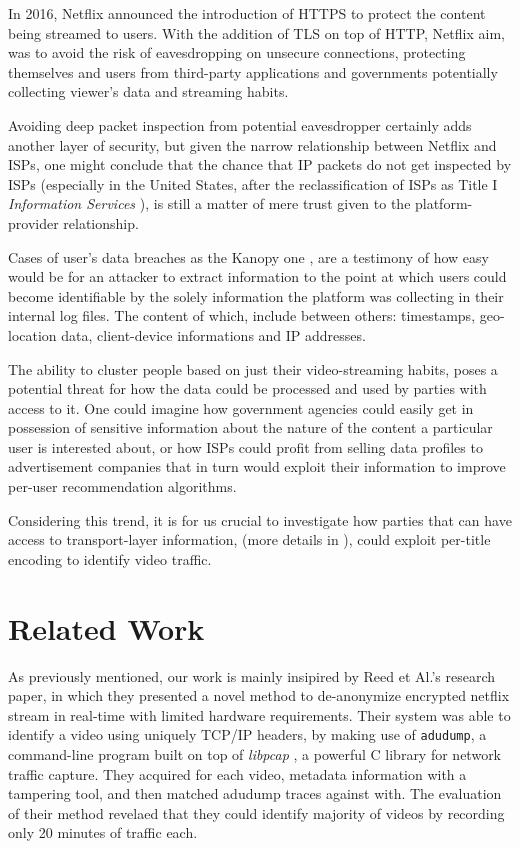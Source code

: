 In 2016, Netflix announced the introduction of HTTPS to protect the content
being streamed to users. With the addition of TLS on top of HTTP, Netflix aim,
was to avoid the risk of eavesdropping on unsecure connections, protecting
themselves and users from third-party applications and governments potentially
collecting viewer's data and streaming habits.

Avoiding deep packet inspection from potential eavesdropper certainly adds
another layer of security, but given the narrow relationship between Netflix
and ISPs, one might conclude that the chance that IP packets do not get
inspected by ISPs (especially in the United States, after the reclassification
of ISPs as Title I \emph{Information Services} \cite{net-neutrality}), is still
a matter of mere trust given to the platform-provider relationship.

Cases of user's data breaches as the Kanopy one \cite{kanopy}, are a testimony
of how easy would be for an attacker to extract information to the point at
which users could become identifiable by the solely information the platform
was collecting in their internal log files. The content of which, include
between others: timestamps, geo-location data, client-device informations and
IP addresses. 

The ability to cluster people based on just their video-streaming habits, poses
a potential threat for how the data could be processed and used by parties with
access to it. One could imagine how government agencies could easily get in
possession of sensitive information about the nature of the content a
particular user is interested about, or how ISPs could profit from selling data
profiles to advertisement companies that in turn would exploit their
information to improve per-user recommendation algorithms.

Considering this trend, it is for us crucial to investigate how parties that
can have access to transport-layer information, (more details in
), could exploit per-title encoding to identify video
traffic. 

\section{Related Work}\label{related}

As previously mentioned, our work is mainly insipired by Reed et Al.'s
\cite{netflix-real-time} research paper, in which they presented a novel method
to de-anonymize encrypted netflix stream in real-time with limited hardware
requirements. Their system was able to identify a video using uniquely TCP/IP
headers, by making use of \texttt{adudump}, a command-line program built on top
of \emph{libpcap} \cite{libpcap}, a powerful C library for network traffic
capture. They acquired for each video, metadata information with a tampering
tool, and then matched adudump traces against with. The evaluation of their
method revelaed that they could identify majority of videos by recording only
20 minutes of traffic each.

